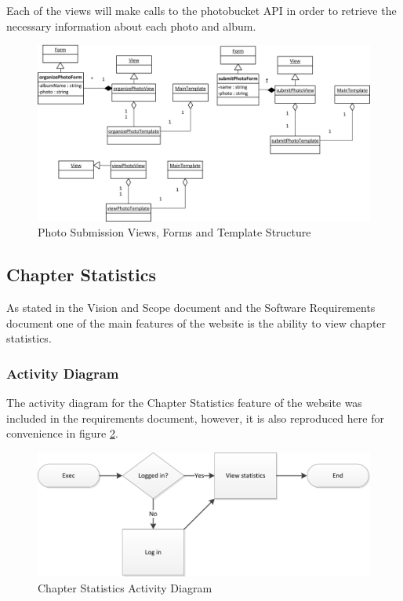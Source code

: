 \documentclass{article}
\begin{document}
Each of the views will make calls to the photobucket API in order to retrieve the necessary information about each photo and album.

\FloatBarrier
\begin{figure}[h!]
\centering
\includegraphics[scale=.65]{img/viewFormTemplateDiagrams/photo}
\caption{Photo Submission Views, Forms and Template Structure}
\label{fig:photoViewFormTemplateDiagram}
\end{figure}
\FloatBarrier

\subsection{Chapter Statistics}

As stated in the Vision and Scope document and the Software Requirements document one of the main features of the website is the ability to view chapter statistics.

\subsubsection{Activity Diagram}
The activity diagram for the Chapter Statistics feature of the website was included in the requirements document, however, it is also reproduced here for convenience in figure \ref{fig:chapterStatisticsActivityDiagram}.

\FloatBarrier
\begin{figure}
\centering
\includegraphics[scale=.65]{img/activityDiagrams/chapterStatisticsActivity1}
\caption{Chapter Statistics Activity Diagram}
\label{fig:chapterStatisticsActivityDiagram}
\end{figure}
\FloatBarrier
\end{document}
